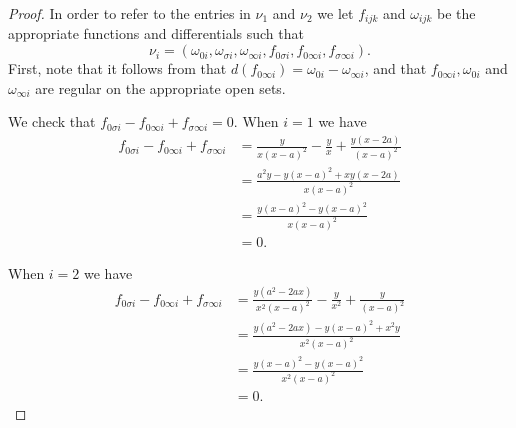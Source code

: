 \documentclass[draft, 11pt]{article} %
\theoremstyle{plain}
\theoremstyle{remark}
\begin{document}
\begin{proof}
In order to refer to the entries in $\nu_1$ and $\nu_2$ we let $f_{ijk}$ and $\omega_{ijk}$ be the appropriate functions and differentials such that
\[
\nu_i = \left( \omega_{0 i}, \omega_{\sigma i}, \omega_{\infty i}, f_{0 \sigma i}, f_{0 \infty i}, f_{\sigma \infty i} \right).
\]
First, note that it follows from \cite{derhamactions} that $d(f_{0 \infty i}) = \omega_{0 i} - \omega_{\infty i}$, and that $f_{0 \infty i}, \omega_{0 i}$ and $\omega_{\infty i}$ are regular on the appropriate open sets.

We check that $f_{0 \sigma i} - f_{0 \infty i}+ f_{\sigma \infty i} = 0$.
When $i=1$ we have
\begin{align*}
f_{0 \sigma i} - f_{0 \infty i}+ f_{\sigma \infty i} & = \frac{y}{x(x-a)^2} -\frac{y}{x} + \frac{y(x-2a)}{(x-a)^2} \\
& = \frac{a^2y- y(x-a)^2  +xy(x-2a)}{x(x-a)^2} \\
& = \frac{y(x-a)^2 - y(x-a)^2}{x(x-a)^2} \\
& = 0.
\end{align*}

When $i=2$ we have
\begin{align*}
f_{0 \sigma i} - f_{0 \infty i}+ f_{\sigma \infty i} & = \frac{y(a^2-2ax)}{x^2(x-a)^2} -\frac{y}{x^2} + \frac{y}{(x-a)^2} \\
& = \frac{y(a^2-2ax)-y(x-a)^2 +x^2y}{x^2(x-a)^2} \\
& = \frac{y(x-a)^2 - y(x-a)^2}{x^2(x-a)^2} \\
& = 0.
\end{align*}


\end{proof}
\end{document}
